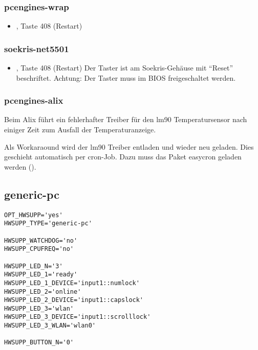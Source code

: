 \subsubsection{pcengines-wrap} 
\begin{itemize}
  \item {}, Taste 408 (Restart)
\end{itemize}

\subsubsection{soekris-net5501}
\begin{itemize}
  \item {}, Taste 408 (Restart)
  \newline Der Taster ist am Soekris-Gehäuse mit ``Reset'' beschriftet. 
  \newline Achtung: Der Taster muss im BIOS freigeschaltet werden.
\end{itemize}


\subsubsection{pcengines-alix}
Beim Alix führt ein fehlerhafter Treiber für den lm90 Temperatursensor nach
einiger Zeit zum Ausfall der Temperaturanzeige. 

Als Workaraound wird der lm90 Treiber entladen und wieder neu geladen.
Dies geschieht automatisch per cron-Job. Dazu muss das Paket easycron geladen
werden ().


\subsection{generic-pc}

\begin{verbatim}
OPT_HWSUPP='yes'
HWSUPP_TYPE='generic-pc'

HWSUPP_WATCHDOG='no'
HWSUPP_CPUFREQ='no'

HWSUPP_LED_N='3'
HWSUPP_LED_1='ready'
HWSUPP_LED_1_DEVICE='input1::numlock'
HWSUPP_LED_2='online'
HWSUPP_LED_2_DEVICE='input1::capslock'
HWSUPP_LED_3='wlan'
HWSUPP_LED_3_DEVICE='input1::scrolllock'
HWSUPP_LED_3_WLAN='wlan0'

HWSUPP_BUTTON_N='0'

\end{verbatim}

